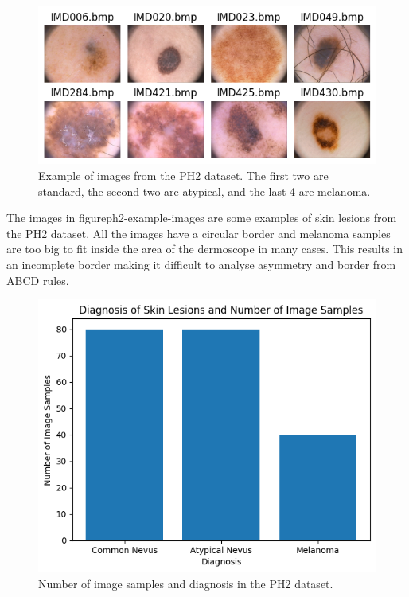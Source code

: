 
\begin{figure}
	\centering
	\includegraphics[scale=0.75]{images/ph2/ph2-example-images.png}
	\caption{Example of images from the PH2 dataset. The first two are standard, the second two are atypical, and the last 4 are melanoma.}
\end{figure}\label{ph2-example-images}

The images in figure{ph2-example-images} are some examples of skin lesions from the PH2 dataset. All the images have a circular border and melanoma samples are too big to fit inside the area of the dermoscope in many cases. This results in an incomplete border making it difficult to analyse asymmetry and border from ABCD rules.

\begin{figure}
	\centering
	\includegraphics[scale=0.75]{images/ph2/ph2-diagnosis-number.png}
	\caption{Number of image samples and diagnosis in the PH2 dataset.}
\end{figure}\label{ph2-diagnosis-number}

